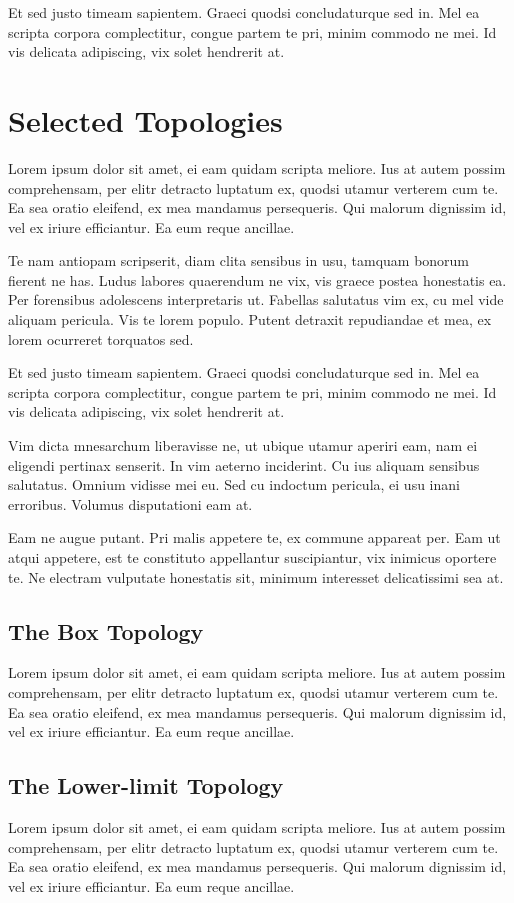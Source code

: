 \documentclass[12pt, a4paper]{article}
\theoremstyle{definition}
\theoremstyle{remark}
\numberwithin{equation}{section}
\numberwithin{figure}{section}
\numberwithin{table}{section}
\begin{document}
            Et sed justo timeam sapientem. Graeci quodsi concludaturque sed in. Mel ea scripta corpora complectitur, congue partem te pri, minim commodo ne mei. Id vis delicata adipiscing, vix solet hendrerit at.

    \newpage
    \section{Selected Topologies}
        Lorem ipsum dolor sit amet, ei eam quidam scripta meliore. Ius at autem possim comprehensam, per elitr detracto luptatum ex, quodsi utamur verterem cum te. Ea sea oratio eleifend, ex mea mandamus persequeris. Qui malorum dignissim id, vel ex iriure efficiantur. Ea eum reque ancillae.

        Te nam antiopam scripserit, diam clita sensibus in usu, tamquam bonorum fierent ne has. Ludus labores quaerendum ne vix, vis graece postea honestatis ea. Per forensibus adolescens interpretaris ut. Fabellas salutatus vim ex, cu mel vide aliquam pericula. Vis te lorem populo. Putent detraxit repudiandae et mea, ex lorem ocurreret torquatos sed.

        Et sed justo timeam sapientem. Graeci quodsi concludaturque sed in. Mel ea scripta corpora complectitur, congue partem te pri, minim commodo ne mei. Id vis delicata adipiscing, vix solet hendrerit at.

        Vim dicta mnesarchum liberavisse ne, ut ubique utamur aperiri eam, nam ei eligendi pertinax senserit. In vim aeterno inciderint. Cu ius aliquam sensibus salutatus. Omnium vidisse mei eu. Sed cu indoctum pericula, ei usu inani erroribus. Volumus disputationi eam at.

        Eam ne augue putant. Pri malis appetere te, ex commune appareat per. Eam ut atqui appetere, est te constituto appellantur suscipiantur, vix inimicus oportere te. Ne electram vulputate honestatis sit, minimum interesset delicatissimi sea at.
        \subsection{The Box Topology}
            Lorem ipsum dolor sit amet, ei eam quidam scripta meliore. Ius at autem possim comprehensam, per elitr detracto luptatum ex, quodsi utamur verterem cum te. Ea sea oratio eleifend, ex mea mandamus persequeris. Qui malorum dignissim id, vel ex iriure efficiantur. Ea eum reque ancillae.        
        \subsection{The Lower-limit Topology}
            Lorem ipsum dolor sit amet, ei eam quidam scripta meliore. Ius at autem possim comprehensam, per elitr detracto luptatum ex, quodsi utamur verterem cum te. Ea sea oratio eleifend, ex mea mandamus persequeris. Qui malorum dignissim id, vel ex iriure efficiantur. Ea eum reque ancillae.
\end{document}
